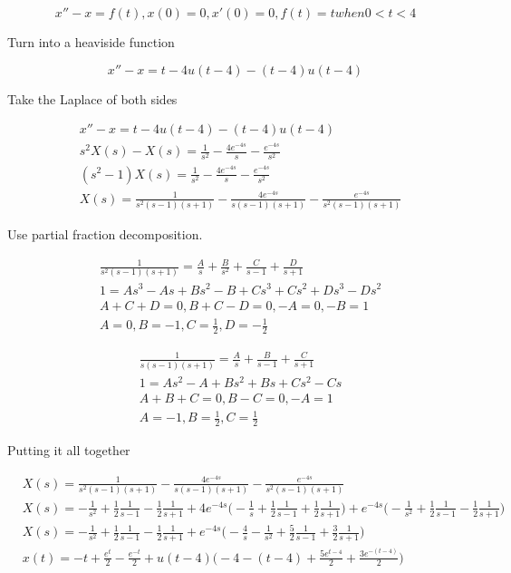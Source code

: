 \documentclass[titlepage]{article}
\begin{document}
$$x'' - x = f(t), x(0) = 0, x'(0) = 0, f(t) = t when 0 < t < 4$$

\noindent Turn into a heaviside function

$$x'' - x = t - 4u(t - 4) - (t - 4)u(t - 4)$$

\noindent Take the Laplace of both sides

\begin{align*}
    &x'' - x = t - 4u(t - 4) - (t - 4)u(t - 4)
 \\ &s^2X(s) - X(s) = \frac{1}{s^2} - \frac{4e^{-4s}}{s} - \frac{e^{-4s}}{s^2}
 \\ &(s^2 - 1)X(s) = \frac{1}{s^2} - \frac{4e^{-4s}}{s} - \frac{e^{-4s}}{s^2}
 \\ &X(s) = \frac{1}{s^2(s - 1)(s + 1)} - \frac{4e^{-4s}}{s(s - 1)(s + 1)} - \frac{e^{-4s}}{s^2(s - 1)(s + 1)}
\end{align*}

\noindent Use partial fraction decomposition.

\begin{align*}
    &\frac{1}{s^2(s - 1)(s + 1)} = \frac{A}{s} + \frac{B}{s^2} + \frac{C}{s - 1} + \frac{D}{s + 1}
 \\ &1 = As^3 - As + Bs^2 - B + Cs^3 + Cs^2 + Ds^3 - Ds^2
 \\ &A + C + D = 0, B + C - D = 0, -A = 0, -B = 1
 \\ &A = 0, B = -1, C = \frac{1}{2}, D = -\frac{1}{2}
\end{align*}

\begin{align*}
    &\frac{1}{s(s - 1)(s + 1)} = \frac{A}{s} + \frac{B}{s - 1} + \frac{C}{s + 1}
 \\ &1 = As^2 - A + Bs^2 + Bs + Cs^2 - Cs
 \\ &A + B + C = 0, B - C = 0, -A = 1
 \\ &A = -1, B = \frac{1}{2}, C = \frac{1}{2}
\end{align*}

\noindent Putting it all together

\begin{align*}
    &X(s) = \frac{1}{s^2(s - 1)(s + 1)} - \frac{4e^{-4s}}{s(s - 1)(s + 1)} - \frac{e^{-4s}}{s^2(s - 1)(s + 1)}
 \\ &X(s) = -\frac{1}{s^2} + \frac{1}{2}\frac{1}{s - 1} - \frac{1}{2}\frac{1}{s + 1}
    + 4e^{-4s}\bigg(-\frac{1}{s} + \frac{1}{2}\frac{1}{s - 1} + \frac{1}{2}\frac{1}{s + 1}\bigg)
    + e^{-4s}\bigg(-\frac{1}{s^2} + \frac{1}{2}\frac{1}{s - 1} - \frac{1}{2}\frac{1}{s + 1}\bigg)
 \\ &X(s) = -\frac{1}{s^2} + \frac{1}{2}\frac{1}{s - 1} - \frac{1}{2}\frac{1}{s + 1}
    + e^{-4s}\bigg(-\frac{4}{s} - \frac{1}{s^2} + \frac{5}{2}\frac{1}{s - 1} + \frac{3}{2}\frac{1}{s + 1}\bigg)
    \\ &x(t) = -t + \frac{e^{t}}{2} - \frac{e^{-t}}{2} + u(t - 4)\bigg(-4 - (t - 4) + \frac{5e^{t - 4}}{2} + \frac{3e^{-(t - 4)}}{2}\bigg)
\end{align*}
\end{document}
